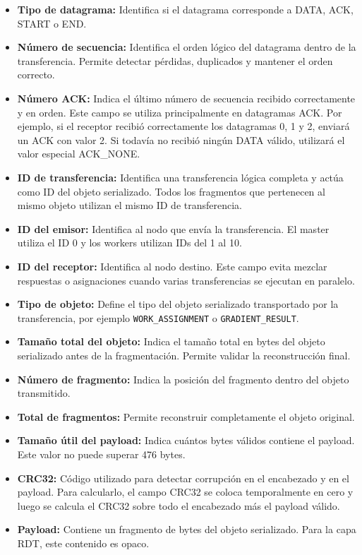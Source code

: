 \documentclass[12pt]{article}
\begin{document}
\begin{itemize}

\item \textbf{Tipo de datagrama:} Identifica si el datagrama corresponde a DATA, ACK, START o END.

\item \textbf{Número de secuencia:} Identifica el orden lógico del datagrama dentro de la transferencia. Permite detectar pérdidas, duplicados y mantener el orden correcto.

\item \textbf{Número ACK:} Indica el último número de secuencia recibido correctamente y en orden. Este campo se utiliza principalmente en datagramas ACK. Por ejemplo, si el receptor recibió correctamente los datagramas 0, 1 y 2, enviará un ACK con valor 2. Si todavía no recibió ningún DATA válido, utilizará el valor especial ACK\_NONE.

\item \textbf{ID de transferencia:} Identifica una transferencia lógica completa y actúa como ID del objeto serializado. Todos los fragmentos que pertenecen al mismo objeto utilizan el mismo ID de transferencia.

\item \textbf{ID del emisor:} Identifica al nodo que envía la transferencia. El master utiliza el ID 0 y los workers utilizan IDs del 1 al 10.

\item \textbf{ID del receptor:} Identifica al nodo destino. Este campo evita mezclar respuestas o asignaciones cuando varias transferencias se ejecutan en paralelo.

\item \textbf{Tipo de objeto:} Define el tipo del objeto serializado transportado por la transferencia, por ejemplo \texttt{WORK\_ASSIGNMENT} o \texttt{GRADIENT\_RESULT}.

\item \textbf{Tamaño total del objeto:} Indica el tamaño total en bytes del objeto serializado antes de la fragmentación. Permite validar la reconstrucción final.

\item \textbf{Número de fragmento:} Indica la posición del fragmento dentro del objeto transmitido.

\item \textbf{Total de fragmentos:} Permite reconstruir completamente el objeto original.

\item \textbf{Tamaño útil del payload:} Indica cuántos bytes válidos contiene el payload. Este valor no puede superar 476 bytes.

\item \textbf{CRC32:} Código utilizado para detectar corrupción en el encabezado y en el payload. Para calcularlo, el campo CRC32 se coloca temporalmente en cero y luego se calcula el CRC32 sobre todo el encabezado más el payload válido.

\item \textbf{Payload:} Contiene un fragmento de bytes del objeto serializado. Para la capa RDT, este contenido es opaco.

\end{itemize}
\end{document}
